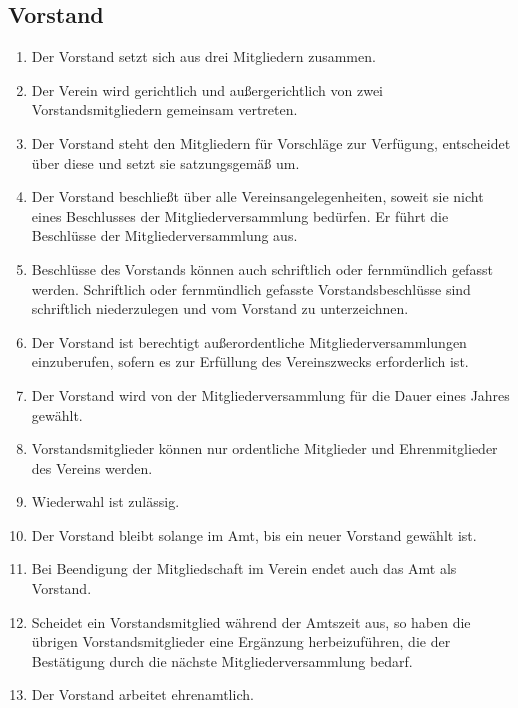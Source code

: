 \documentclass[12pt,a4paper,draft]{article}
\begin{document}
\subsection{Vorstand} %
\begin{enumerate}
\item Der Vorstand setzt sich aus drei Mitgliedern zusammen. %

\item Der Verein wird gerichtlich und außergerichtlich von zwei 
Vorstandsmitgliedern gemeinsam vertreten.

\item Der Vorstand steht den Mitgliedern für Vorschläge zur Verfügung, 
entscheidet über diese und setzt sie satzungsgemäß um.

\item Der Vorstand beschließt über alle Vereinsangelegenheiten, soweit sie 
nicht eines Beschlusses der Mitgliederversammlung bedürfen. Er führt die 
Beschlüsse der Mitgliederversammlung aus.

\item Beschlüsse des Vorstands können auch schriftlich oder fernmündlich 
gefasst werden. Schriftlich oder fernmündlich gefasste Vorstandsbeschlüsse 
sind schriftlich niederzulegen und vom Vorstand zu unterzeichnen.

\item Der Vorstand ist berechtigt außerordentliche Mitgliederversammlungen 
einzuberufen, sofern es zur Erfüllung des Vereinszwecks erforderlich ist.

\item Der Vorstand wird von der Mitgliederversammlung für die Dauer eines 
Jahres gewählt.

\item Vorstandsmitglieder können nur ordentliche Mitglieder und Ehrenmitglieder 
des Vereins werden.

\item Wiederwahl ist zulässig.

\item Der Vorstand bleibt solange im Amt, bis ein neuer Vorstand gewählt ist.

\item Bei Beendigung der Mitgliedschaft im Verein endet auch das Amt als 
Vorstand.

\item Scheidet ein Vorstandsmitglied während der Amtszeit aus, so haben die 
übrigen Vorstandsmitglieder eine Ergänzung herbeizuführen, die der Bestätigung 
durch die nächste Mitgliederversammlung bedarf.

\item Der Vorstand arbeitet ehrenamtlich. %
\end{enumerate}
\end{document}
